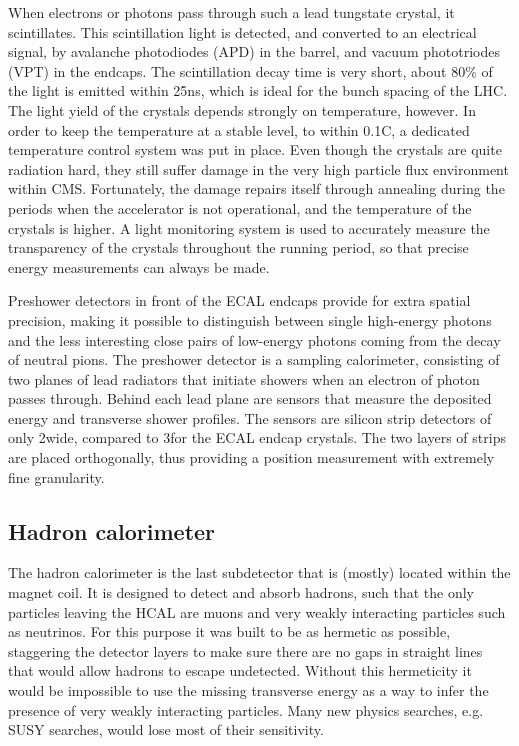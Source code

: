 When electrons or photons pass through such a lead tungstate crystal, it scintillates. 
This scintillation light is detected, and converted to an electrical signal, by avalanche
photodiodes (APD) in the barrel, and vacuum phototriodes (VPT) in the endcaps.
The scintillation decay time is very short, about 80\% of the light is emitted within 25\unit{ns},
which is ideal for the bunch spacing of the LHC. 
The light yield of the crystals depends strongly on temperature, however. In order to keep the
temperature at a stable level, to within 0.1\de C, a dedicated temperature control system was put in
place.
Even though the crystals are quite radiation hard, they still suffer damage in the very high
particle flux environment within CMS. Fortunately, the damage repairs itself through annealing
during the periods when the accelerator is not operational, and the temperature of the crystals is
higher. A light monitoring system is used to accurately measure the transparency of the crystals
throughout the running period, so that precise energy measurements can always be made. 

Preshower detectors in front of the ECAL endcaps provide for extra spatial precision, making it
possible to distinguish between single high-energy photons and the less interesting close pairs of
low-energy photons coming from the decay of neutral pions.
The preshower detector is a sampling calorimeter, consisting of two planes of lead radiators that
initiate showers when an electron of photon passes through. Behind each lead plane are sensors that
measure the deposited energy and transverse shower profiles. 
The sensors are silicon strip detectors of only 2\mm wide, compared to 3\cm for the ECAL endcap
crystals. The two layers of strips are placed orthogonally, thus providing a position
measurement with extremely fine granularity. 


\subsection{Hadron calorimeter \label{sec:cms_hcal}}

The hadron calorimeter is the last subdetector that is (mostly) located within the magnet coil. It
is designed to detect and absorb hadrons, such that the only particles leaving the HCAL are muons
and very weakly interacting particles such as neutrinos.
For this purpose it was built to be as hermetic as possible, staggering the detector layers to
make sure there are no gaps in straight lines that would allow hadrons to escape undetected.
Without this hermeticity it would be impossible to use the missing transverse energy as a way to
infer the presence of very weakly interacting particles. Many new physics searches, e.g. SUSY
searches, would lose most of their sensitivity. 

